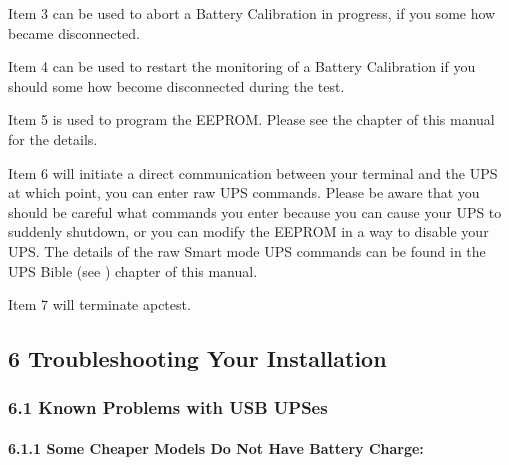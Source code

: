 {{{{Item 3 can be used to abort a Battery Calibration in progress, if you some how
became disconnected.  

Item 4 can be used to restart the monitoring of a Battery Calibration if you
should some how become disconnected during the test.  

Item 5 is used to program the EEPROM. Please see the 
 chapter
of this manual for the details.  

Item 6 will initiate a direct communication between your terminal and the UPS
at which point, you can enter raw UPS commands. Please be aware that you
should be careful what commands you enter because you can cause your UPS to
suddenly shutdown, or you can modify the EEPROM in a way to disable your UPS.
The details of the raw Smart mode UPS commands can be found in the UPS Bible
(see 
) chapter of this
manual.  

Item 7 will terminate apctest. 

\label{Troubleshooting-Your-Installation}

\subsection*{6 Troubleshooting Your Installation}

\label{index-Troubleshooting-_0028see-problems_0029-101}
\label{index-Problems-102}

\label{Known-Problems-with-USB-UPSes}

\subsubsection*{6.1 Known Problems with USB UPSes}

\label{index-Problems_002c-USB-103}

\label{Some-Cheaper-Models-Do-Not-Have-Battery-Charge}

\paragraph*{6.1.1 Some Cheaper Models Do Not Have Battery Charge:}

}}}}
